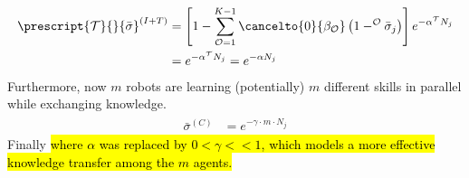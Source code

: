 \begin{align}
    \begin{split}
        \prescript{\mathcal{T}}{}{\bar{\sigma}}^{(I+T)} &= \left[1- \sum^{K-1}_{\mathcal{O}=1}\cancelto{0}{\beta_\mathcal{O}} \left( 1 - ^\mathcal{O}\bar{\sigma}_j \right)\right]e^{-\alpha ^\mathcal{T}N_j}\\
        &= e^{-\alpha ^\mathcal{T}N_j} = e^{-\alpha N_j} 
    \end{split}
\end{align}
Furthermore, now $m$ robots are learning (potentially) $m$ different skills in parallel while exchanging knowledge.
\begin{align}
\begin{split}
    \bar{\sigma}^{(C)} &= e^{-\gamma \cdot m\cdot N_j}    
\end{split}
\end{align}
Finally
\hl{where $\alpha$ was replaced by $ 0<\gamma<<1$, which models a more effective knowledge transfer among the $m$ agents.}




